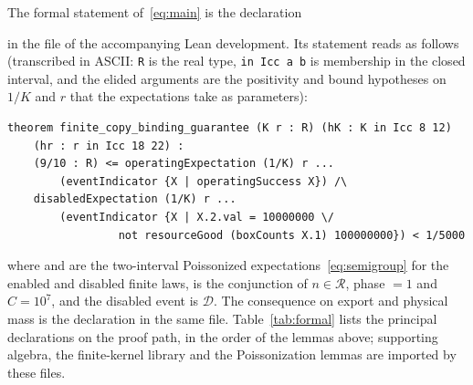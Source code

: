 \documentclass[11pt,a4paper]{article}
\theoremstyle{plain}
\theoremstyle{definition}
\theoremstyle{remark}
\newcommand{\R}{\mathcal R}
\newcommand{\Doff}{\mathcal D}
\begin{document}
The formal statement of~\eqref{eq:main} is the declaration
\begin{center}
\end{center}
in the file  of the accompanying Lean development. Its statement reads as follows (transcribed in ASCII: \texttt{R} is the real type, \texttt{in Icc a b} is membership in the closed interval, and the elided arguments are the positivity and bound hypotheses on $1/K$ and $r$ that the expectations take as parameters):
\begingroup\small
\begin{verbatim}
theorem finite_copy_binding_guarantee (K r : R) (hK : K in Icc 8 12)
    (hr : r in Icc 18 22) :
    (9/10 : R) <= operatingExpectation (1/K) r ...
        (eventIndicator {X | operatingSuccess X}) /\
    disabledExpectation (1/K) r ...
        (eventIndicator {X | X.2.val = 10000000 \/
                 not resourceGood (boxCounts X.1) 100000000}) < 1/5000
\end{verbatim}
\endgroup
where  and  are the two-interval Poissonized expectations~\eqref{eq:semigroup} for the enabled and disabled finite laws,  is the conjunction of $n\in\R$, phase $=1$ and $C=10^7$, and the disabled event is $\Doff$. The consequence on export and physical mass is the declaration  in the same file. Table~\ref{tab:formal} lists the principal declarations on the proof path, in the order of the lemmas above; supporting algebra, the finite-kernel library and the Poissonization lemmas are imported by these files.
\end{document}

